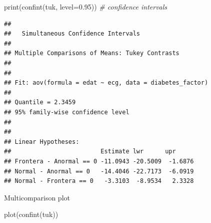 \documentclass[
  ignorenonframetext,
]{beamer}
\newenvironment{Shaded}{\begin{snugshade}}{\end{snugshade}}
\newcommand{\AttributeTok}[1]{\textcolor[rgb]{0.77,0.63,0.00}{#1}}
\newcommand{\CommentTok}[1]{\textcolor[rgb]{0.56,0.35,0.01}{\textit{#1}}}
\newcommand{\FloatTok}[1]{\textcolor[rgb]{0.00,0.00,0.81}{#1}}
\newcommand{\FunctionTok}[1]{\textcolor[rgb]{0.00,0.00,0.00}{#1}}
\newcommand{\NormalTok}[1]{#1}
\begin{document}
\begin{frame}[fragile]
\tiny

\begin{Shaded}
\begin{Highlighting}[]
  \FunctionTok{print}\NormalTok{(}\FunctionTok{confint}\NormalTok{(tuk, }\AttributeTok{level=}\FloatTok{0.95}\NormalTok{)) }\CommentTok{\# confidence intervals}
\end{Highlighting}
\end{Shaded}

\begin{verbatim}
## 
##   Simultaneous Confidence Intervals
## 
## Multiple Comparisons of Means: Tukey Contrasts
## 
## 
## Fit: aov(formula = edat ~ ecg, data = diabetes_factor)
## 
## Quantile = 2.3459
## 95% family-wise confidence level
##  
## 
## Linear Hypotheses:
##                         Estimate lwr      upr     
## Frontera - Anormal == 0 -11.0943 -20.5009  -1.6876
## Normal - Anormal == 0   -14.4046 -22.7173  -6.0919
## Normal - Frontera == 0   -3.3103  -8.9534   2.3328
\end{verbatim}
\end{frame}

\begin{frame}[fragile]{Multicomparison plot}
\protect\hypertarget{multicomparison-plot}{}
\small

\begin{Shaded}
\begin{Highlighting}[]
  \FunctionTok{plot}\NormalTok{(}\FunctionTok{confint}\NormalTok{(tuk))}
\end{Highlighting}
\end{Shaded}
\end{frame}
\end{document}
